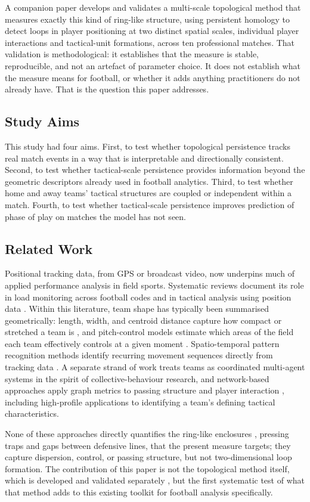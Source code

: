 A companion paper \cite{paperA} develops and validates a multi-scale
topological method that measures exactly this kind of ring-like
structure, using persistent homology to detect loops in player
positioning at two distinct spatial scales, individual player interactions and tactical-unit formations, across ten professional
matches. That validation is methodological: it establishes that the
measure is stable, reproducible, and not an artefact of parameter
choice. It does not establish what the measure means for football, or
whether it adds anything practitioners do not already have. That is the
question this paper addresses.

\subsection{Study Aims}

This study had four aims. First, to test whether topological persistence
tracks real match events in a way that is interpretable and
directionally consistent. Second, to test whether tactical-scale
persistence provides information beyond the geometric descriptors
already used in football analytics. Third, to test whether home and
away teams' tactical structures are coupled or independent within a
match. Fourth, to test whether tactical-scale persistence improves
prediction of phase of play on matches the model has not seen.

\subsection{Related Work}

Positional tracking data, from GPS or broadcast video, now underpins
much of applied performance analysis in field sports. Systematic reviews
document its role in load monitoring across football codes
\cite{tracking_review} and in tactical analysis using position data
\cite{memmert2017}. Within this literature, team shape
has typically been summarised geometrically: length, width, and
centroid distance capture how compact or stretched a team is
\cite{shape_descriptors}, and pitch-control models estimate which areas
of the field each team effectively controls at a given moment
\cite{gudmundsson2017}. Spatio-temporal pattern recognition methods
identify recurring movement sequences directly from tracking data
\cite{memmert2017}. A separate strand of work treats teams as
coordinated multi-agent systems in the spirit of collective-behaviour
research, and network-based approaches apply graph metrics to passing
structure and player interaction \cite{grund2012,buldu2018}, including
high-profile applications to identifying a team's defining tactical
characteristics.

None of these approaches directly quantifies the ring-like enclosures
, pressing traps and gaps between defensive lines, that the present
measure targets; they capture dispersion, control, or passing
structure, but not two-dimensional loop formation. The contribution of
this paper is not the topological method itself, which is developed and
validated separately \cite{paperA}, but the first systematic test of
what that method adds to this existing toolkit for football analysis
specifically.
